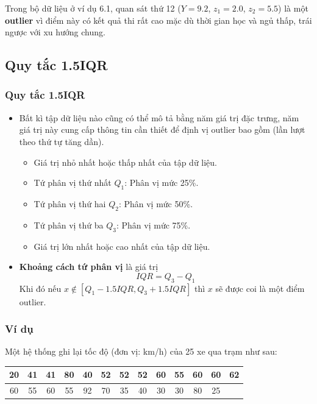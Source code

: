 \begin{footnotesize}
\begin{frame}
\vspace{0.5em}
Trong bộ dữ liệu ở ví dụ 6.1, quan sát thứ 12 ($Y=9.2$, $z_1 = 2.0$, $z_2 = 5.5$) là một \textbf{outlier} vì điểm này có kết quả thi rất cao mặc dù thời gian học và ngủ thấp, trái ngược với xu hướng chung.
\end{frame}

\subsection{Quy tắc 1.5IQR}
\begin{frame}
\frametitle{Quy tắc 1.5IQR}
\begin{itemize}
    \item Bất kì tập dữ liệu nào cũng có thể mô tả bằng năm giá trị đặc trưng, năm giá trị này cung cấp thông tin cần thiết để định vị outlier bao gồm (lần lượt theo thứ tự tăng dần).
    \begin{itemize}
        \item Giá trị nhỏ nhất hoặc thấp nhất của tập dữ liệu.
        \item Tứ phân vị thứ nhất $Q_1$: Phân vị mức 25\%.
        \item Tứ phân vị thứ hai $Q_2$: Phân vị mức 50\%.
        \item Tứ phân vị thứ ba $Q_3$: Phân vị mức 75\%.
        \item Giá trị lớn nhất hoặc cao nhất của tập dữ liệu.
    \end{itemize}
    \item \textbf{Khoảng cách tứ phân vị} là giá trị
    \[
    IQR = Q_3 - Q_1
    \]
    Khi đó nếu $x \notin \left[Q_1 - 1.5IQR, Q_3 + 1.5IQR\right]$ thì $x$ sẽ được coi là một điểm outlier.
\end{itemize}
\end{frame}
\begin{frame}
\frametitle{Ví dụ}
	    Một hệ thống ghi lại tốc độ (đơn vị: km/h) của 25 xe qua trạm như sau: 
        \begin{center}
            \begin{tabular}{|c|c|c|c|c|c|c|c|c|c|c|c|c|}
	\hline 
	20 & 41 & 41 & 80 & 40 & 52 & 52 & 52 & 60 & 55 & 60 & 60 & 62 \\ \hline
60 & 55 & 60 & 55 & 92 & 70 & 35 & 40 & 30 & 30 & 80 & 25 &  \\ \hline
\end{tabular}

\end{center}
\end{frame}
\end{footnotesize}
